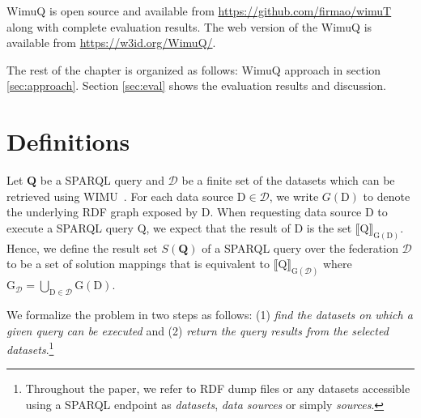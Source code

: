 \begin{itemize}
    
    
    
\end{itemize}

WimuQ is open source and available from \url{https://github.com/firmao/wimuT} along with complete evaluation results. The web version of the WimuQ is available from  \url{https://w3id.org/WimuQ/}. 

The rest of the chapter is organized as follows:
WimuQ approach in section \ref{sec:approach}. Section \ref{sec:eval} shows the evaluation results and discussion.

\section{Definitions} \label{preliminaries}

Let $\mathbf{Q}$ be a SPARQL query and $\mathcal{D}$ be a finite set of the datasets which can be retrieved using WIMU~\cite{valdestilhas2018my}.
For each data source $\mathrm{D} \in \mathcal{D}$, we write $G(\mathrm{D})$ to denote the underlying RDF graph exposed by $\mathrm{D}$. 
When requesting data source $\mathrm{D}$ to execute a SPARQL query $\mathrm{Q}$, we expect that the result of $\mathrm{D}$ is the set ${\llbracket \mathrm{Q} \rrbracket}_{\mathrm{G}(\mathrm{D})}$. 
Hence, we define the result set $S(\mathbf{Q})$ of a SPARQL query over the federation $\mathcal{D}$ to be a set of solution mappings that is equivalent to ${\llbracket \mathrm{Q} \rrbracket}_{\mathrm{G}(\mathcal{D})}$ where $\mathrm{G}_\mathcal{D}=\bigcup_{\mathrm{D} \in \mathcal{D}} \mathrm{G}(\mathrm{D})$.

We formalize the problem in two steps as follows: (1) \emph{find the datasets on which a given query can be executed} and (2) \emph{return the query results from the selected datasets}.\footnote{Throughout the paper, we refer to RDF dump files or any datasets accessible using a SPARQL endpoint as \emph{datasets}, \emph{data sources} or simply \emph{sources}.}

